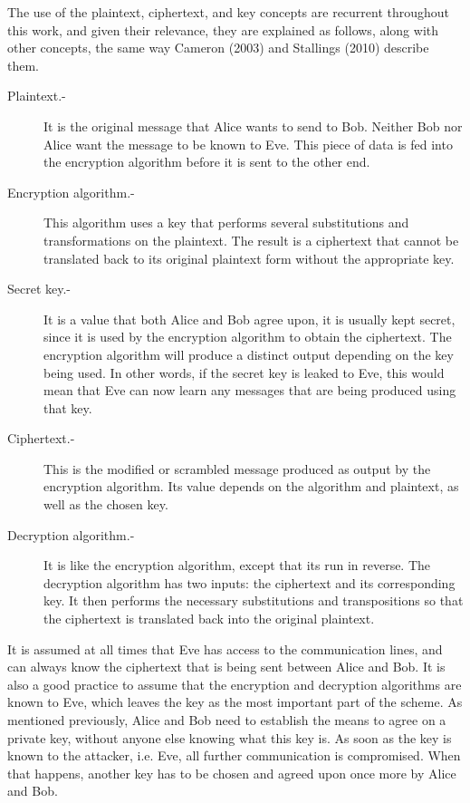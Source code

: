 The use of the plaintext, ciphertext, and key concepts are recurrent throughout this work, and given their relevance, they are explained as follows, along with other concepts, the same way Cameron (2003) \cite{CryptoNotes} and Stallings (2010) \cite{CryptoStallings} describe them.
\begin{description}
\item[Plaintext.-] It is the original message that Alice wants to send to Bob. Neither Bob nor Alice want the message to be known to Eve. This piece of data is fed into the encryption algorithm before it is sent to the other end.
\item[Encryption algorithm.-] This algorithm uses a key that performs several substitutions and transformations on the plaintext. The result is a ciphertext that cannot be translated back to its original plaintext form without the appropriate key.
\item[Secret key.-] It is a value that both Alice and Bob agree upon, it is usually kept secret, since it is used by the encryption algorithm to obtain the ciphertext. The encryption algorithm will produce a distinct output depending on the key being used. In other words, if the secret key is leaked to Eve, this would mean that Eve can now learn any messages that are being produced using that key.
\item[Ciphertext.-] This is the modified or scrambled message produced as output by the encryption algorithm. Its value depends on the algorithm and plaintext, as well as the chosen key.
\item[Decryption algorithm.-] It is like the encryption algorithm, except that its run in reverse. The decryption algorithm has two inputs: the ciphertext and its corresponding key. It then performs the necessary substitutions and transpositions so that the ciphertext is translated back into the original plaintext.
\end{description}

It is assumed at all times that Eve has access to the communication lines, and can always know the ciphertext that is being sent between Alice and Bob. It is also a good practice to assume that the encryption and decryption algorithms are known to Eve, which leaves the key as the most important part of the scheme. As mentioned previously, Alice and Bob need to establish the means to agree on a private key, without anyone else knowing what this key is. As soon as the key is known to the attacker, i.e. Eve, all further communication is compromised. When that happens, another key has to be chosen and agreed upon once more by Alice and Bob.

